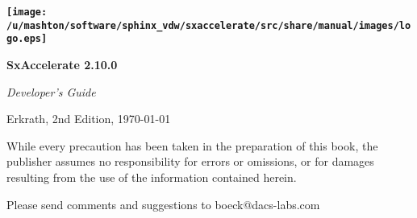 \thispagestyle{empty}\vspace*{.5\textheight}


\begin{flushright}
\textbf{\Huge \texttt{[image: /u/mashton/software/sphinx\_vdw/sxaccelerate/src/share/manual/images/logo.eps]}}
\par\end{flushright}{\Huge \par}

\begin{flushright}
\textbf{\Huge SxAccelerate 2.10.0}
\par\end{flushright}{\Huge \par}

\begin{flushright}
{\Huge \hrulefill}
\par\end{flushright}{\Huge \par}

\begin{flushright}
\emph{\Huge Developer's Guide}
\par\end{flushright}{\Huge \par}

\newpage{}

\textbf{\Huge \thispagestyle{empty}}{\Huge \par}

{\small Erkrath, 2nd Edition, \today}{\small \par}

\vspace*{0.8\textheight}
While every precaution has been taken in the preparation of this book,
the publisher assumes no responsibility for errors or omissions, or
for damages resulting from the use of the information contained herein.
\vspace{1em}

Please send comments and suggestions to boeck@dacs-labs.com\newpage{}

